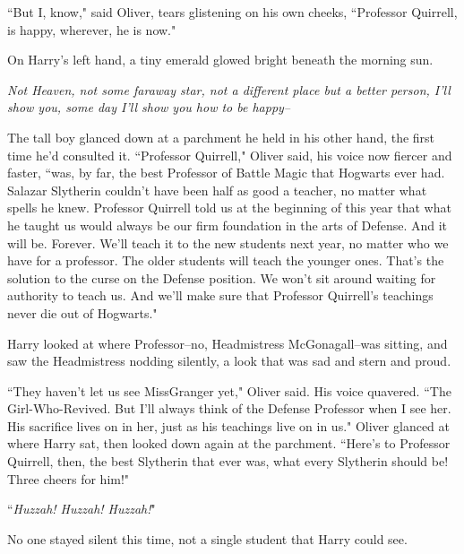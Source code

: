 ``But I, know," said Oliver, tears glistening on his own cheeks, ``Professor Quirrell, is happy, wherever, he is now."

On Harry's left hand, a tiny emerald glowed bright beneath the morning sun.

\emph{Not Heaven, not some faraway star, not a different place but a better person, I'll show you, some day I'll show you how to be happy\---}

The tall boy glanced down at a parchment he held in his other hand, the first time he'd consulted it. ``Professor Quirrell," Oliver said, his voice now fiercer and faster, ``was, by far, the best Professor of Battle Magic that Hogwarts ever had. Salazar Slytherin couldn't have been half as good a teacher, no matter what spells he knew. Professor Quirrell told us at the beginning of this year that what he taught us would always be our firm foundation in the arts of Defense. And it will be. Forever. We'll teach it to the new students next year, no matter who we have for a professor. The older students will teach the younger ones. That's the solution to the curse on the Defense position. We won't sit around waiting for authority to teach us. And we'll make sure that Professor Quirrell's teachings never die out of Hogwarts."

Harry looked at where Professor\---no, Headmistress McGonagall\---was sitting, and saw the Headmistress nodding silently, a look that was sad and stern and proud.

``They haven't let us see Miss\?Granger yet," Oliver said. His voice quavered. ``The Girl-Who-Revived. But I'll always think of the Defense Professor when I see her. His sacrifice lives on in her, just as his teachings live on in us." Oliver glanced at where Harry sat, then looked down again at the parchment. ``Here's to Professor Quirrell, then, the best Slytherin that ever was, what every Slytherin should be! Three cheers for him!"

``\emph{Huzzah! Huzzah! Huzzah!}"

No one stayed silent this time, not a single student that Harry could see.

